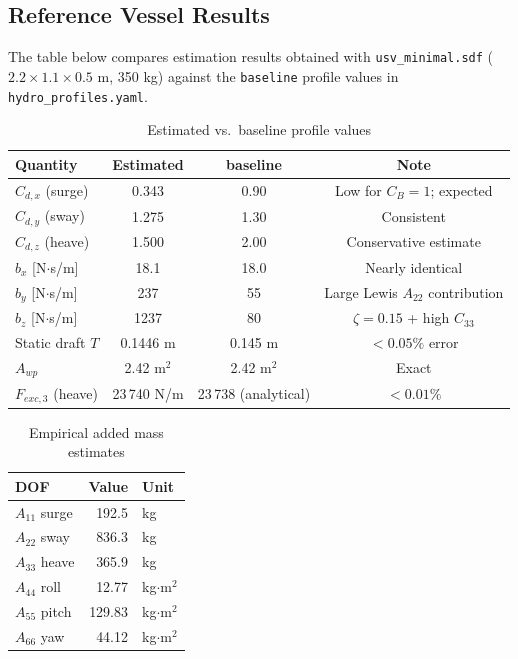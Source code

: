 \documentclass[12pt,a4paper]{article}
\begin{document}
\subsection{Reference Vessel Results}

The table below compares estimation results obtained with
\texttt{usv\_minimal.sdf} ($2.2\times1.1\times0.5$ m, 350 kg)
against the \texttt{baseline} profile values in \texttt{hydro\_profiles.yaml}.

\begin{table}[H]
  \centering
  \caption{Estimated vs.\ baseline profile values}
  \begin{tabular}{lccc}
    \toprule
    \textbf{Quantity} & \textbf{Estimated} & \textbf{baseline} & \textbf{Note} \\
    \midrule
    $C_{d,x}$ (surge) & 0.343 & 0.90 & Low for $C_B{=}1$; expected \\
    $C_{d,y}$ (sway)  & 1.275 & 1.30 & Consistent \\
    $C_{d,z}$ (heave) & 1.500 & 2.00 & Conservative estimate \\
    $b_x$ [N$\cdot$s/m] & 18.1 & 18.0 & Nearly identical \\
    $b_y$ [N$\cdot$s/m] & 237  & 55   & Large Lewis $A_{22}$ contribution \\
    $b_z$ [N$\cdot$s/m] & 1237 & 80   & $\zeta{=}0.15$ + high $C_{33}$ \\
    \midrule
    Static draft $T$ & 0.1446 m & 0.145 m & $<0.05\%$ error \\
    $A_{wp}$ & 2.42 m$^2$ & 2.42 m$^2$ & Exact \\
    $F_{exc,3}$ (heave) & 23\,740 N/m & 23\,738 (analytical) & $<0.01\%$ \\
    \bottomrule
  \end{tabular}
\end{table}

\begin{table}[H]
  \centering
  \caption{Empirical added mass estimates}
  \begin{tabular}{lrl}
    \toprule
    \textbf{DOF} & \textbf{Value} & \textbf{Unit} \\
    \midrule
    $A_{11}$ surge  & 192.5  & kg \\
    $A_{22}$ sway   & 836.3  & kg \\
    $A_{33}$ heave  & 365.9  & kg \\
    $A_{44}$ roll   & 12.77  & kg$\cdot$m$^2$ \\
    $A_{55}$ pitch  & 129.83 & kg$\cdot$m$^2$ \\
    $A_{66}$ yaw    & 44.12  & kg$\cdot$m$^2$ \\
    \bottomrule
  \end{tabular}
\end{table}
\end{document}
